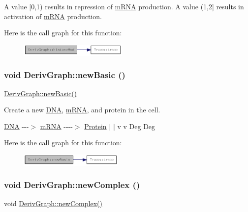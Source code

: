 A value \mbox{[}0,1) results in repression of \hyperlink{classmRNA}{mRNA} production. A value (1,2\mbox{]} results in activation of \hyperlink{classmRNA}{mRNA} production. 

Here is the call graph for this function:\nopagebreak
\begin{figure}[H]
\begin{center}
\leavevmode
\includegraphics[width=150pt]{classDerivGraph_ae39d9acba4901f668d8a85c88bfcc21a_cgraph}
\end{center}
\end{figure}
\hypertarget{classDerivGraph_a8862d4f9ebbd3eced9d56a81fe91c4fb}{
\subsubsection[{newBasic}]{\setlength{\rightskip}{0pt plus 5cm}void DerivGraph::newBasic ()}}
\label{classDerivGraph_a8862d4f9ebbd3eced9d56a81fe91c4fb}
\hyperlink{classDerivGraph_a8862d4f9ebbd3eced9d56a81fe91c4fb}{DerivGraph::newBasic()}

Create a new \hyperlink{classDNA}{DNA}, \hyperlink{classmRNA}{mRNA}, and protein in the cell.

\hyperlink{classDNA}{DNA} -\/-\/-\/$>$ \hyperlink{classmRNA}{mRNA} -\/-\/-\/-\/$>$ \hyperlink{classProtein}{Protein} $|$ $|$ v v Deg Deg 

Here is the call graph for this function:\nopagebreak
\begin{figure}[H]
\begin{center}
\leavevmode
\includegraphics[width=144pt]{classDerivGraph_a8862d4f9ebbd3eced9d56a81fe91c4fb_cgraph}
\end{center}
\end{figure}
\hypertarget{classDerivGraph_a4be722e989002430ca7c363dce500638}{
\subsubsection[{newComplex}]{\setlength{\rightskip}{0pt plus 5cm}void DerivGraph::newComplex ()}}
\label{classDerivGraph_a4be722e989002430ca7c363dce500638}
void \hyperlink{classDerivGraph_a4be722e989002430ca7c363dce500638}{DerivGraph::newComplex()}

